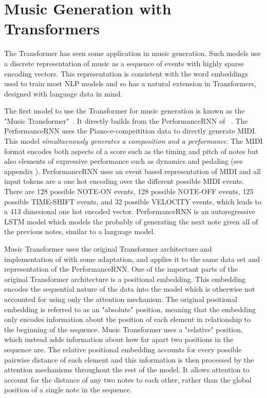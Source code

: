 
\section{Music Generation with Transformers}
The Transformer has seen some application in music generation. Such models use a discrete representation of music as a sequence of events with highly sparse encoding vectors. This representation is consistent with the word embeddings used to train most NLP models and so has a natural extension in Transformers, designed with language data in mind. 

The first model to use the Transformer for music generation is known as the "Music Transformer"~\cite{huang2018music}. It directly builds from the PerformanceRNN of ~\citet{oore2020time}. The PerformanceRNN uses the Piano-e-compeitition data to directly generate MIDI. This model \emph{simultaenously generates a composition and a performance}. The MIDI format encodes both aspects of a score such as the timing and pitch of notes but also elements of expressive performance such as dynamics and pedaling (see appendix ). PerformanceRNN uses an event based representation of MIDI and all input tokens are a one hot encoding over the different possible MIDI events. There are 128 possible NOTE-ON events, 128 possible NOTE-OFF events, 125 possible TIME-SHIFT events, and 32 possible VELOCITY events, which leads to a 413 dimesional one hot encoded vector. PerformanceRNN is an autoregressive LSTM model which models the probably of generating the next note given all of the previous notes, similar to a language model. 

Music Transformer uses the original Transformer architecture and implementation of \citet{vaswani2017attention} with some adaptation, and applies it to the same data set and representation of the PerformanceRNN. One of the important parts of the original Transformer architecture is a positional embedding. This embedding encodes the sequential nature of the data into the model which is otherwise not accounted for using only the attention mechanism. The original positional embedding is referred to as an "absolute" position, meaning that the embedding only encodes information about the position of each element in relationship to the beginning of the sequence. Music Transformer uses a "relative" position, which instead adds information about how far apart two positions in the sequence are. The relative positional embedding accounts for every possible pairwise distance of each element and this information is then processed by the attention mechanisms throughout the rest of the model. It allows attention to account for the distance of any two notes to each other, rather than the global position of a single note in the sequence. 

